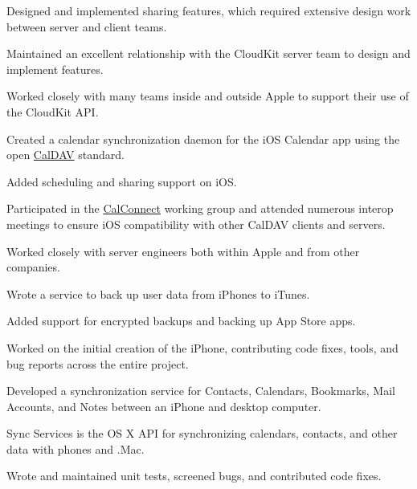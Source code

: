 \begin{cventries}
{\begin{cvsubentries}
{\begin{cvitems}
         		\item {Designed and implemented sharing features, which required extensive design work between server and client teams.}
		    	\item {Maintained an excellent relationship with the CloudKit server team to design and implement features.}
         		\item {Worked closely with many teams inside and outside Apple to support their use of the CloudKit API.}
         	 \end{cvitems}
        		}
       		{}%
		{
		\begin{cvitems}
         		\item {Created a calendar synchronization daemon for the iOS Calendar app using the open \href{https://tools.ietf.org/html/rfc4791}{CalDAV} standard.}
			\item {Added scheduling and sharing support on iOS.} 
         		\item {Participated in the \href{https://www.calconnect.org}{CalConnect} working group and attended numerous interop meetings to ensure iOS compatibility with other CalDAV clients and servers.}
			\item {Worked closely with server engineers both within Apple and from other companies.}
         	 \end{cvitems}
        		}
       		{}
		{
		\begin{cvitems}
         		\item {Wrote a service to back up user data from iPhones to iTunes.}
			\item {Added support for encrypted backups and backing up App Store apps.}
         	 \end{cvitems}
        		}
       		{}
		{
		\begin{cvitems}
			\item {Worked on the initial creation of the iPhone, contributing code fixes, tools, and bug reports across the entire project.}
         		\item {Developed a synchronization service for Contacts, Calendars, Bookmarks, Mail Accounts, and Notes between an iPhone and desktop computer.}
         	 \end{cvitems}
        		}
       		{Sync Services is the OS X API for synchronizing calendars, contacts, and other data with phones and .Mac.}
		{
		\begin{cvitems}
         		\item {Wrote and maintained unit tests, screened bugs, and contributed code fixes.}
         	 \end{cvitems}
        		}
      	\end{cvsubentries}
    }
\end{cventries}
